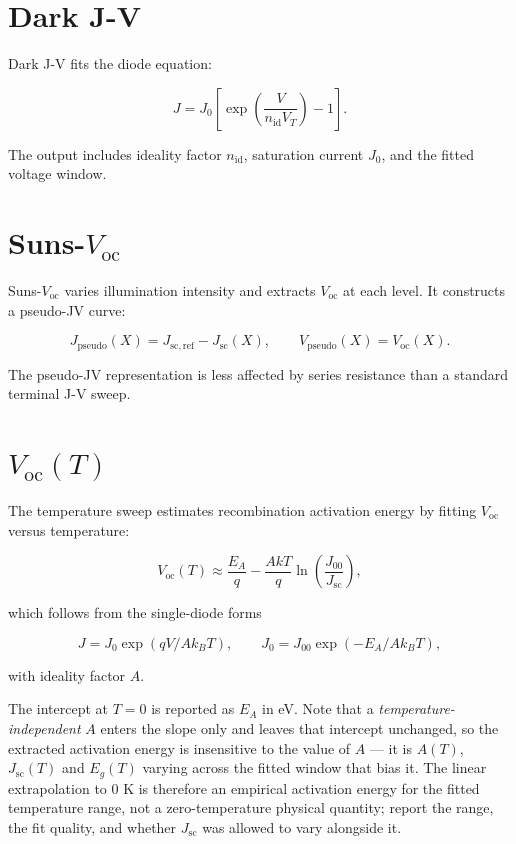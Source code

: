 \documentclass[
  11pt,
  american,
]{report}
\begin{document}
\hypertarget{dark-j-v}{%
\section{Dark J-V}\label{dark-j-v}}

Dark J-V fits the diode equation:

\[
J=J_0\left[\exp\left(\frac{V}{n_\mathrm{id}V_T}\right)-1\right].
\]

The output includes ideality factor \(n_\mathrm{id}\), saturation
current \(J_0\), and the fitted voltage window.

\hypertarget{suns-v_mathrmoc}{%
\section{\texorpdfstring{Suns-\(V_\mathrm{oc}\)}{Suns-V\_\textbackslash mathrm\{oc\}}}\label{suns-v_mathrmoc}}

Suns-\(V_\mathrm{oc}\) varies illumination intensity and extracts
\(V_\mathrm{oc}\) at each level. It constructs a pseudo-JV curve:

\[
J_\mathrm{pseudo}(X)
=J_{\mathrm{sc,ref}}-J_\mathrm{sc}(X),
\qquad
V_\mathrm{pseudo}(X)=V_\mathrm{oc}(X).
\]

The pseudo-JV representation is less affected by series resistance than
a standard terminal J-V sweep.

\hypertarget{v_mathrmoct}{%
\section{\texorpdfstring{\(V_\mathrm{oc}(T)\)}{V\_\textbackslash mathrm\{oc\}(T)}}\label{v_mathrmoct}}

The temperature sweep estimates recombination activation energy by
fitting \(V_\mathrm{oc}\) versus temperature:

\[
V_\mathrm{oc}(T)
\approx
\frac{E_A}{q}
-
\frac{A k T}{q}
\ln\left(\frac{J_{00}}{J_\mathrm{sc}}\right),
\]

which follows from the single-diode forms

\[
J = J_0\exp(qV/Ak_BT),\qquad
J_0 = J_{00}\exp(-E_A/Ak_BT),
\]

with ideality factor \(A\).

The intercept at \(T=0\) is reported as \(E_A\) in eV. Note that a
\emph{temperature-independent} \(A\) enters the slope only and leaves
that intercept unchanged, so the extracted activation energy is
insensitive to the value of \(A\) --- it is \(A(T)\),
\(J_\mathrm{sc}(T)\) and \(E_g(T)\) varying across the fitted window
that bias it. The linear extrapolation to 0 K is therefore an empirical
activation energy for the fitted temperature range, not a
zero-temperature physical quantity; report the range, the fit quality,
and whether \(J_\mathrm{sc}\) was allowed to vary alongside it.
\end{document}
